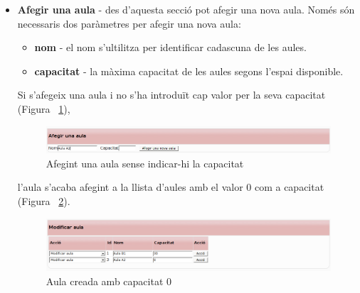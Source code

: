 \documentclass[a4paper]{report}  %
\begin{document}
\begin{itemize}
\item\textbf{Afegir una aula} - des d'aquesta secció pot afegir una nova aula.
Només són necessaris dos paràmetres per afegir una nova aula:
	\begin{itemize}
	\item\textbf{nom} - el nom s'ultilitza per identificar cadascuna de les aules.
	\item\textbf{capacitat} - la màxima capacitat de les aules segons l'espai disponible.
	\end{itemize}
	
Si s'afegeix una aula i no s'ha introduït cap valor per la seva capacitat (Figura ~\ref{fig:AddAulaNoCapacity}), 
\begin{figure}[H] %
\begin{center}
\includegraphics[width=16cm]{img/AddAulaNoCapacity.png}
\caption[List caption]{Afegint una aula sense indicar-hi la capacitat}
\label{fig:AddAulaNoCapacity}
\end{center}
\end{figure}

l'aula s'acaba afegint a la llista d'aules amb el valor 0 com a capacitat (Figura ~\ref{fig:AddAula0Capacity}).
\begin{figure}[H] %
\begin{center}
\includegraphics[width=16cm]{img/AddAula0Capacity.png}
\caption[List caption]{Aula creada amb capacitat 0}
\label{fig:AddAula0Capacity}
\end{center}
\end{figure}


\end{itemize}
\end{document}

